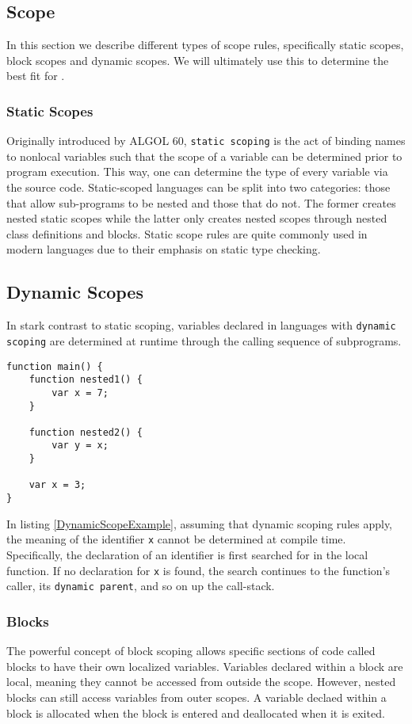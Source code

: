 \subsection{Scope}
In this section we describe different types of scope rules, specifically static scopes, block scopes and dynamic scopes.
We will ultimately use this to determine the best fit for \dazel{}.

\subsubsection{Static Scopes}
Originally introduced by ALGOL 60, \texttt{static scoping} is the act of binding names to nonlocal variables such that the scope of a variable
can be determined prior to program execution. This way, one can determine the type of every variable via the source code.
Static-scoped languages can be split into two categories: those that allow sub-programs to be nested and those that do not.
The former creates nested static scopes while the latter only creates nested scopes through nested class definitions and blocks. 
Static scope rules are quite commonly used in modern languages due to their emphasis on static type checking.\cite{sebesta_concepts_2016}

\subsection{Dynamic Scopes}
In stark contrast to static scoping, variables declared in languages with \texttt{dynamic scoping} are determined at runtime through the calling sequence of subprograms.

\begin{lstlisting}[caption={Example of dynamic scoping}, label={lst:DynamicScopeExample}]
function main() {
	function nested1() {
		var x = 7;
	}
	
	function nested2() {
		var y = x;
	}

	var x = 3;
}
\end{lstlisting}

In listing \ref{DynamicScopeExample}, assuming that dynamic scoping rules apply, the meaning of the identifier \texttt{x} cannot be determined at compile time.
Specifically, the declaration of an identifier is first searched for in the local function. 
If no declaration for \texttt{x} is found, the search continues to the function's caller, its \texttt{dynamic parent}, and so on up the call-stack.\cite{sebesta_concepts_2016}

\subsubsection{Blocks}
The powerful concept of block scoping allows specific sections of code called blocks to have their own localized variables. 
Variables declared within a block are local, meaning they cannot be accessed from outside the scope. However, nested blocks can still access variables from outer scopes.
A variable declaed within a block is allocated when the block is entered and deallocated when it is exited.\cite{sebesta_concepts_2016}


